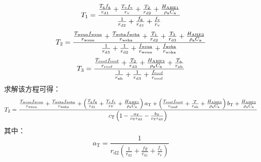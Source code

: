 %
\begin{equation}
  \label{3lay_T1}
  T_{1} =\frac{\frac{T_{\mathrm{g}} f_{\mathrm{g}}}{r_{\mathrm{d1}}} + \frac{T_{\mathrm{v}} f_{\rm v}}{r_{\mathrm{v}}} + \frac{T_{\mathrm{2}}}{r_{\mathrm{d2}}} + \frac{H_{\mathrm{AHE1}}}{\rho _{\rm a} C_{\mathrm a}}}{\frac{1}{r_{\mathrm{d2}}} + \frac{f_{\mathrm{g}}}{r_{\mathrm{d1}}} + \frac{f_{\rm v}}{r_{\mathrm{v}}}}
\end{equation}
%
\begin{equation}
  T_{2} = \frac{\frac{T_{\mathrm{wsun}} f_{\mathrm{wsun}}}{r_{\mathrm{wsun}}} + \frac{T_{\mathrm{wsha}} f_{\mathrm{wsha}}}{r_{\mathrm{wsha}}} +  \frac{T_{1}}{r_{\mathrm{d2}}} + \frac{T_{\mathrm{3}}}{r_{\mathrm{d3}}} + \frac{H_{\mathrm{AHE2}}}{\rho _{\rm a} C_{\mathrm a}}}{\frac{1}{r_{\mathrm{d3}}} + \frac{1}{r_{\mathrm{d2}}} + \frac{f_{\mathrm{wsun}}}{r_{\mathrm{wsun}}} + \frac{f_{\mathrm{wsha}}}{r_{\mathrm{wsha}}}}
\end{equation}
%
\begin{equation}
  \label{3lay_T3}
  T_{3} = \frac{\frac{T_{\mathrm{roof}} f_{\mathrm{roof}}}{r_{\mathrm{roof}}} + \frac{T_{\mathrm{2}}}{r_{\mathrm{d3}}} + \frac{H_{\mathrm{AHE3}}}{\rho _{\rm a} C_{\mathrm a}} + \frac{T_{\rm a}}{r_{\mathrm{ah}}}}{\frac{1}{r_{\mathrm{ah}}} + \frac{1}{r_{\mathrm{d3}}} + \frac{f_{\mathrm{roof}}}{r_{\mathrm{roof}}}}
\end{equation}
求解该方程可得：
\begin{equation}
  \begin{split}
    T_{2} = \frac{\frac{T_{\mathrm{wsun}} f_{\mathrm{wsun}}}{r_{\mathrm{wsun}}} + \frac{T_{\mathrm{wsha}} f_{\mathrm{wsha}}}{r_{\mathrm{wsha}}} + \left(\frac{T_{\mathrm{g}} f_{\mathrm{g}}}{r_{\mathrm{d1}}} + \frac{T_{\mathrm{v}} f_{\mathrm{v}}}{rv} + \frac{H_{\mathrm{AHE1}}}{\rho _{\rm a} C_{\mathrm a}}\right)a_{\mathrm{T}} + \left(\frac{T_{\mathrm{roof}} f_{\mathrm{roof}}}{r_{\mathrm{roof}}} + \frac{T}{r_{\mathrm{ah}}} + \frac{H_{\mathrm{AHE3}}}{\rho _{\rm a} C_{\mathrm a}}\right)b_{\mathrm{T}} + \frac{H_{\mathrm{AHE2}}}{\rho _{\rm a} C_{\mathrm a}}}{c_{\mathrm{T}} \left(1-\frac{a_{\mathrm{T}}}{c_{\mathrm{T}} r_{\mathrm{d2}}}-\frac{b_{\mathrm{T}}}{c_{\mathrm{T}} r_{\mathrm{d3}}}\right)}
  \end{split}
\end{equation}
其中：
\begin{equation}
  a_{\mathrm{T}} = \frac{1}{r_{\mathrm{d2}} \left(\frac{1}{r_{\mathrm{d2}}} + \frac{fg}{r_{\mathrm{d1}}} + \frac{f_{\mathrm{v}}}{r_{\mathrm{v}}} \right)}
\end{equation}
